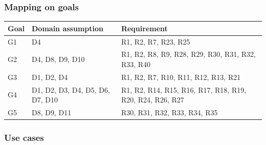 \documentclass[11pt]{article}
\begin{document}
\subsubsection{Mapping on goals}

\begin{table}[H]
    \centering
    \setlength{\tabcolsep}{18pt}
    \renewcommand{\arraystretch}{1.2}
    \begin{tabularx}{\textwidth}{|>{\hsize=0.4\hsize}X|>{\hsize=1\hsize}X|>{\hsize=1.6\hsize}X|}
        \hline
        \textbf{Goal} & \textbf{Domain assumption} & \textbf{Requirement} \\
        \hline
        G1 & D4 & R1, R2, R7, R23, R25 \\ %
        \hline
        G2 & D4, D8, D9, D10 & R1, R2, R8, R9, R28, R29, R30, R31, R32, R33, R40 \\ %
        \hline
        G3 & D1, D2, D4 & R1, R2, R7, R10, R11, R12, R13, R21 \\ %
        \hline
        G4 & D1, D2, D3, D4, D5, D6, D7, D10 & R1, R2, R14, R15, R16, R17, R18, R19, R20, R24, R26, R27 \\ %
        \hline
        G5 & D8, D9, D11 & R30, R31, R32, R33, R34, R35 \\ %
        \hline
    \end{tabularx}
    \label{tab:requirementsMapping}
\end{table}

\subsubsection{Use cases}
\end{document}
